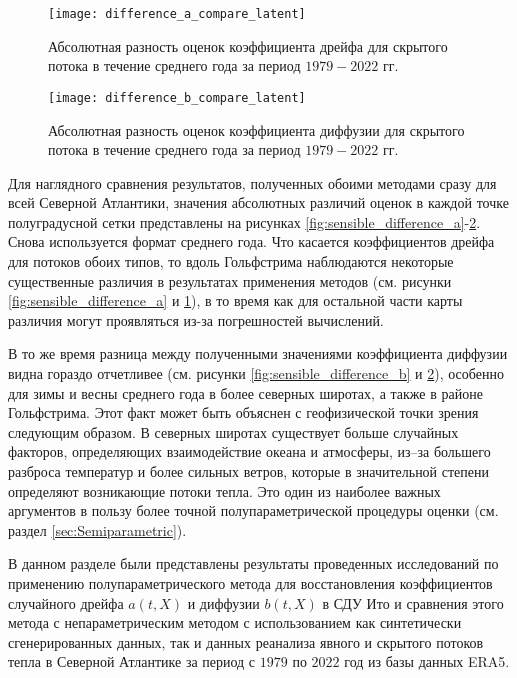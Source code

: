 \begin{figure}[!h]
	\centering
	\texttt{[image: difference\_a\_compare\_latent]}
	\caption{Абсолютная разность оценок коэффициента дрейфа для скрытого потока в течение среднего года за период $1979-2022$ гг.} 
	\label{fig:latent_difference_a}
\end{figure}


\begin{figure}[!h]
	\centering
	\texttt{[image: difference\_b\_compare\_latent]}
	\caption{Абсолютная разность оценок коэффициента диффузии для скрытого потока в течение среднего года за период $1979-2022$ гг.} 
	\label{fig:latent_difference_b}
\end{figure}

Для наглядного сравнения результатов, полученных обоими методами сразу для всей Северной Атлантики, значения абсолютных различий оценок в каждой точке полуградусной сетки представлены на рисунках \ref{fig:sensible_difference_a}-\ref{fig:latent_difference_b}. Снова используется формат среднего года.
Что касается коэффициентов дрейфа для потоков обоих типов, то вдоль Гольфстрима наблюдаются некоторые существенные различия в результатах применения методов (см. рисунки \ref{fig:sensible_difference_a} и \ref{fig:latent_difference_a}), в то время как для остальной части карты различия могут проявляться из-за погрешностей вычислений.

В то же время разница между полученными значениями коэффициента диффузии видна гораздо отчетливее (см. рисунки \ref{fig:sensible_difference_b} и \ref{fig:latent_difference_b}), особенно для зимы и весны среднего года в более северных широтах, а также в районе Гольфстрима. Этот факт может быть объяснен с геофизической точки зрения следующим образом. В северных широтах существует больше случайных факторов, определяющих взаимодействие океана и атмосферы, из–за большего разброса температур и более сильных ветров, которые в значительной степени определяют возникающие потоки тепла. Это один из наиболее важных аргументов в пользу более точной полупараметрической процедуры оценки (см. раздел \ref{sec:Semiparametric}).

В данном разделе были представлены результаты проведенных исследований по применению полупараметрического метода для восстановления коэффициентов случайного дрейфа $a(t,X)$ и диффузии $b(t,X)$ в СДУ Ито и сравнения этого метода с непараметрическим методом с использованием как синтетически сгенерированных данных, так и данных реанализа явного и скрытого потоков тепла в Северной Атлантике за период с $1979$ по $2022$ год из базы данных ERA5.

